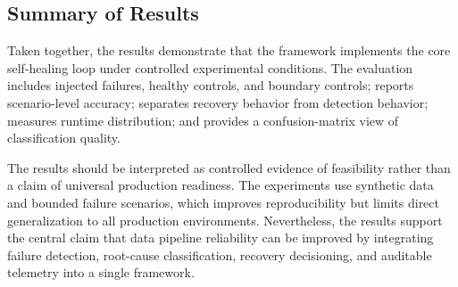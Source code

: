 \subsection{Summary of Results}

Taken together, the results demonstrate that the framework implements the core self-healing loop under controlled experimental conditions. The evaluation includes injected failures, healthy controls, and boundary controls; reports scenario-level accuracy; separates recovery behavior from detection behavior; measures runtime distribution; and provides a confusion-matrix view of classification quality.

The results should be interpreted as controlled evidence of feasibility rather than a claim of universal production readiness. The experiments use synthetic data and bounded failure scenarios, which improves reproducibility but limits direct generalization to all production environments. Nevertheless, the results support the central claim that data pipeline reliability can be improved by integrating failure detection, root-cause classification, recovery decisioning, and auditable telemetry into a single framework.

